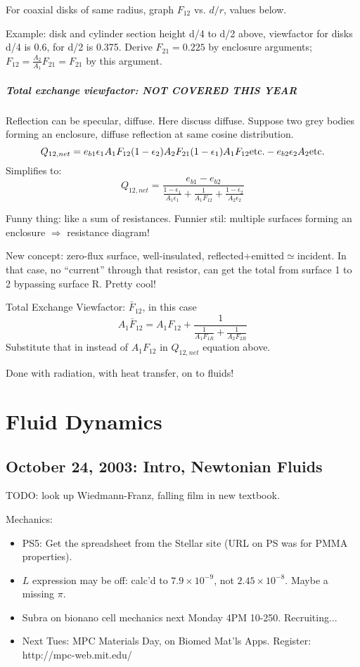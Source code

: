 \documentclass{report}
\begin{document}
For coaxial disks of same radius, graph $F_{12}$ vs. $d/r$, values below.

Example: disk and cylinder section height d/4 to d/2 above, viewfactor for
disks d/4 is 0.6, for d/2 is 0.375.  Derive $F_{21}=0.225$ by enclosure
arguments; $F_{12}=\frac{A_2}{A_1}F_{21}=F_{21}$ by this argument.

\paragraph{Total exchange viewfactor: NOT COVERED THIS YEAR}

Reflection can be specular, diffuse.  Here discuss diffuse.  Suppose two grey
bodies forming an enclosure, diffuse reflection at same cosine distribution.
$$Q_{12, net} = e_{b1} \epsilon_1 A_1 F_{12} (1-\epsilon_2) A_2 F_{21}
(1-\epsilon_1) A_1 F_{12} {\rm etc.} - e_{b2} \epsilon_2 A_2 {\rm etc.}$$
Simplifies to:
$$Q_{12, net} = \frac{e_{b1} - e_{b2}}{\frac{1-\epsilon_1}{A_1\epsilon_1} +
  \frac{1}{A_1F_{12}} + \frac{1-\epsilon_2}{A_2\epsilon_2}}$$

Funny thing: like a sum of resistances.  Funnier stil: multiple surfaces
forming an enclosure $\Rightarrow$ resistance diagram!

New concept: zero-flux surface, well-insulated,
reflected+emitted$\simeq$incident.  In that case, no ``current'' through that
resistor, can get the total from surface 1 to 2 bypassing surface R.  Pretty
cool!

Total Exchange Viewfactor: $\bar{F}_{12}$, in this case
$$A_1 \bar{F}_{12} = A_1 F_{12} +
\frac{1}{\frac{1}{A_1 F_{1R}} + \frac{1}{A_2 F_{2R}}}$$
Substitute that in instead of $A_1F_{12}$ in $Q_{12,net}$ equation above.

Done with radiation, with heat transfer, on to fluids!


\chapter{Fluid Dynamics}

\section{October 24, 2003: Intro, Newtonian Fluids}

TODO: look up Wiedmann-Franz, falling film in new textbook.

Mechanics:
\begin{itemize}
\item PS5: Get the spreadsheet from the Stellar site (URL on PS was for PMMA
  properties).
\item $L$ expression may be off: calc'd to $7.9\times10^{-9}$, not
  $2.45\times10^{-8}$.  Maybe a missing $\pi$.
\item Subra on bionano cell mechanics next Monday 4PM 10-250.  Recruiting...
\item Next Tues: MPC Materials Day, on Biomed Mat'ls Apps.  Register:
  http://mpc-web.mit.edu/
\end{itemize}
\end{document}
